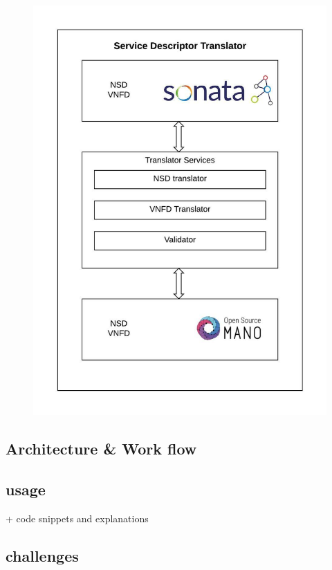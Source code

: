 \begin{figure}
	\centering
	\includegraphics[width=1\linewidth]{"figures/Service Descriptor Translator"}
	\caption{}
	\label{fig:service-descriptor-translator}
\end{figure}

\subsection{Architecture \& Work flow}
\subsection{usage}

+ code snippets and explanations

\subsection{challenges}
